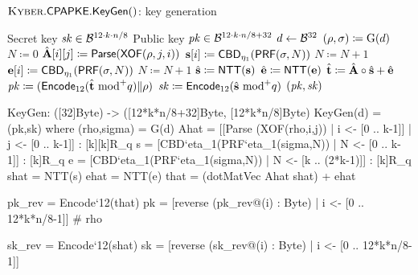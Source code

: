 \begin{algorithm}
  \caption{$\text{{\sc Kyber}}.{\sf CPAPKE}.\mathsf{KeyGen}()$: key generation
  \label{kybercpa-gen}}
  \begin{algorithmic}[1]
    \Ensure Secret key $\mathit{sk} \in \mathcal{B}^{12\cdot k\cdot n/8}$
    \Ensure Public key $\mathit{pk} \in \mathcal{B}^{12\cdot k\cdot n/8 + 32}$
    \State $d \gets \mathcal{B}^{32}$                  \label{line:secretrandomness}
    \State $(\rho, \sigma) \coloneqq \text{G}(d)$ 
    \State $N \coloneqq 0$
               
      \State $\hat{\mathbf{A}}[i][j] \coloneqq \mathsf{Parse}(\mathsf{XOF}(\rho, j, i))$
    \EndFor
    \EndFor
               
    \State $\mathbf{s}[i] \coloneqq \mathsf{CBD}_{\eta_1}(\mathsf{PRF}(\sigma, N))$
    \State $N \coloneqq N+1$
    \EndFor
               
    \State $\mathbf{e}[i] \coloneqq \mathsf{CBD}_{\eta_1}(\mathsf{PRF}(\sigma, N))$
    \State $N \coloneqq N+1$
    \EndFor
    \State $\hat{\mathbf{s}} \coloneqq \mbox{\textsf{NTT}}(\mathbf{s})$\label{line:kybercpa-gen:ntts}
    \State $\hat{\mathbf{e}} \coloneqq \mbox{\textsf{NTT}}(\mathbf{e})$
    \State $\hat{\mathbf{t}} \coloneqq \hat{\mathbf{A}} \circ \hat{\mathbf{s}} + \hat{\mathbf{e}}$\label{line:kybercpa-gen:invnttas}
    \State $\mathit{pk} \coloneqq (\mathsf{Encode}_{12}(\hat{\mathbf{t}} \text{ mod}^+ q)\Vert\rho)$\Comment{$\pk \coloneqq \Apo\spo + \epo$}
    \State $\mathit{sk} \coloneqq \mathsf{Encode}_{12}(\hat{\mathbf{s}} \text{ mod}^+ q)$\Comment{$\sk \coloneqq \spo$}
    \State \Return $(\mathit{pk}, \mathit{sk})$
  \end{algorithmic}
\end{algorithm}

\begin{code}
  KeyGen: ([32]Byte) -> ([12*k*n/8+32]Byte, [12*k*n/8]Byte)
  KeyGen(d) = (pk,sk) where
    (rho,sigma) = G(d)
    Ahat = [[Parse (XOF(rho,i,j)) | i <- [0 .. k-1]] | j <- [0 .. k-1]] : [k][k]R_q
    s = [CBD`{eta_1}(PRF`{eta_1}(sigma,N)) | N <- [0 .. k-1]] : [k]R_q
    e = [CBD`{eta_1}(PRF`{eta_1}(sigma,N)) | N <- [k .. (2*k-1)]] : [k]R_q
    shat = NTT(s)
    ehat = NTT(e)
    that = (dotMatVec Ahat shat) + ehat
    
    pk_rev = Encode`{12}(that)
    pk = [reverse (pk_rev@(i) : Byte) | i <- [0 .. 12*k*n/8-1]] # rho

    sk_rev = Encode`{12}(shat)
    sk = [reverse (sk_rev@(i) : Byte) | i <- [0 .. 12*k*n/8-1]]

\end{code}

